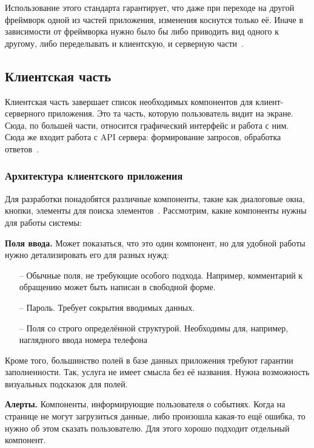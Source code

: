 \documentclass[a4paper,article]{article}
\begin{document}
\begin{sloppypar}
    Использование этого стандарта гарантирует, что даже при переходе на другой фреймворк одной из частей приложения, изменения коснутся только её. Иначе в зависимости от фреймворка нужно было бы либо приводить вид одного к другому, либо переделывать и клиентскую, и серверную части~\cite{httpstatus}.

    \newpage

    \subsection{Клиентская часть}

    Клиентская часть завершает список необходимых компонентов для клиент-серверного приложения. Это та часть, которую пользователь видит на экране. Сюда, по большей части, относится графический интерфейс и работа с ним. Сюда же входит работа с API сервера: формирование запросов, обработка ответов~\cite{baeldungbook, webapi}.

    \subsubsection{Архитектура клиентского приложения}

    Для разработки понадобятся различные компоненты, такие как диалоговые окна, кнопки, элементы для поиска элементов~\cite{vuejs}. Рассмотрим, какие компоненты нужны для работы системы:

    \textbf{Поля ввода.} Может показаться, что это один компонент, но для удобной работы нужно детализировать его для разных нужд:

    \begin{itemize}[nolistsep]
        \item[--] Обычные поля, не требующие особого подхода. Например, комментарий к обращению может быть написан в свободной форме.
        \item[--] Пароль. Требует сокрытия вводимых данных.
        \item[--] Поля со строго определённой структурой. Необходимы для, например, наглядного ввода номера телефона
    \end{itemize}

    Кроме того, большинство полей в базе данных приложения требуют гарантии заполненности. Так, услуга не имеет смысла без её названия. Нужна возможность визуальных подсказок для полей.

    \textbf{Алерты.} Компоненты, информирующие пользователя о событиях. Когда на странице не могут загрузиться данные, либо произошла какая-то ещё ошибка, то нужно об этом сказать пользователю. Для этого хорошо подходит отдельный компонент.


\end{sloppypar}
\end{document}

